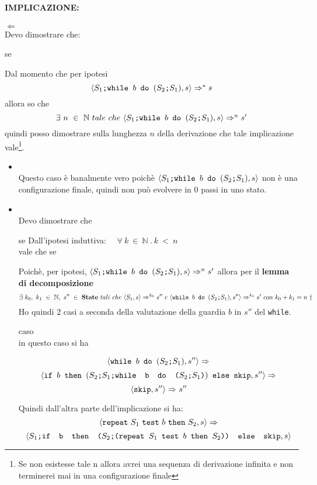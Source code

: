 {	\paragraph{IMPLICAZIONE: } \textbf{\Large{$\Longleftarrow$}} \\
	Devo dimostrare che:
	\begin{center}
	se \exThreeRtL{}
	\end{center}
	Dal momento che per ipotesi \[ \confSs{\PDef{}}{s}\Rar{*}s \] allora so che 
	\[ \exists{}~n~\in~\mathbb{N}~tale~che~\confSs{\PDef{}}{s}\Rar{n}s'  \]quindi
	posso dimostrare sulla lunghezza $n$ della derivazione che tale
	implicazione vale\footnote{Se non esistesse tale n allora avrei una sequenza di derivazione infinita e non terminerei mai in una configurazione finale}.\\
	\begin{itemize}
	\item{} \\
	
	Questo caso è banalmente vero poichè $\confSs{\PDef{}}{s}$
	non è una configurazione finale, quindi non può evolvere in 0 passi in uno
	stato.

	\item{} \\
	Devo dimostrare che 
	\begin{center}
	se 
	 Dall'ipotesi induttiva: $ \quad\forall{}~k~\in~\mathbb{N}~.~k~<~n$ \\
	vale che se 
	\end{center}
	Poichè, per ipotesi, $\confSs{\PDef{}}{s}\Rar{n}s'$ allora per il
	\textbf{lemma di decomposizione} 
	\[ \exists{}~k_0,~k_1~\in~\mathbb{N},~
	s''~\in~\states{}~tali~che~\confSs{S_1}{s}\Rar{k_0}s''~e~\confSs{
	\wbS{b}{(\concat{$S_2$}{$S_1$})}}{s''}\Rar{k_1}s'~con~k_0+k_1=n$  $\dagger  \]
	Ho quindi 2 casi a seconda della valutazione della guardia $b$ in $s''$ del
	\texttt{while}.

		\subitem caso  \\
		in questo caso si ha 
		
		\[ \langle{}\mbox{\normalfont{\texttt{while }}} b \textrm{\normalfont{\texttt{ do }}} (\textrm{\normalfont{\texttt{$S_2$;$S_1$}}}), s''\rangle{}\Rightarrow^{} \]
		\[ \langle{}\mbox{\normalfont{\texttt{if }}} b \textrm{\normalfont{\texttt{ then }}} (\textrm{\normalfont{\texttt{\textrm{\normalfont{\texttt{$S_2$;$S_1$}}};\mbox{\normalfont{\texttt{while }}} b \textrm{\normalfont{\texttt{ do }}} (\textrm{\normalfont{\texttt{$S_2$;$S_1$}}})}}}) \textrm{\normalfont{\texttt{ else }}} \textrm{\normalfont{\texttt{skip}}}, s''\rangle{}\Rightarrow^{} \]
		\[ \langle{}\textrm{\normalfont{\texttt{skip}}}, s''\rangle{}\Rightarrow^{}s'' \]

		Quindi dall'altra parte dell'implicazione si ha:
		\[ \langle{}\texttt{repeat}~S_1~\texttt{test}~b~\texttt{then}~S_2, s\rangle{}\Rightarrow^{} \]
		\[ \langle{}\textrm{\normalfont{\texttt{$S_1$;\mbox{\normalfont{\texttt{if }}} b \textrm{\normalfont{\texttt{ then }}} (\textrm{\normalfont{\texttt{$S_2$;(\texttt{repeat}~$S_1$~\texttt{test}~$b$~\texttt{then}~$S_2$)}}}) \textrm{\normalfont{\texttt{ else }}} \textrm{\normalfont{\texttt{skip}}}}}}, s\rangle{} \]


\end{itemize}}
